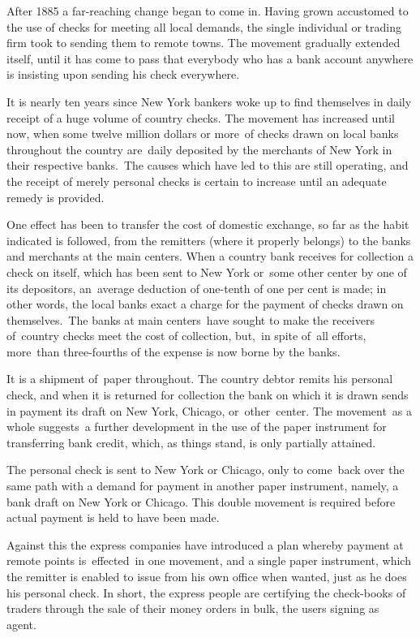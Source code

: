 \documentclass[twoside,symmetric,nobib,justified]{tufte-book}
\begin{document}
\newpage After 1885 a far-reaching change began to come in. Having grown
accustomed to the use of checks for meeting all local demands, the
single individual or trading firm took to sending them to remote towns.
The movement gradually extended itself, until it has come to pass that
everybody who has a bank account anywhere is insisting upon sending his
check everywhere. ~

It is nearly ten years since New York bankers woke up to find themselves
in daily receipt of a huge volume of country checks. The movement has
increased until now, when some twelve million dollars or more~of checks
drawn on local banks throughout the country are~daily deposited by the
merchants of New York in their respective banks.~The causes which have
led to this are still operating, and the receipt of merely personal
checks is certain to increase until an adequate remedy is provided.~

One effect has been to transfer the cost of domestic exchange, so far as
the habit indicated is followed, from the remitters (where it properly
belongs) to the banks and merchants at the main centers. When a country
bank receives for collection a check on itself, which has been sent to
New York or~some other center by one of its depositors, an~average
deduction of one-tenth of one per cent is made; in other words, the
local banks exact a charge for the payment of checks drawn on
themselves.~The banks at main centers~have sought to make the receivers
of~country checks meet the cost of collection, but,~in spite of~all
efforts, more~than three-fourths of the expense is now borne by the
banks.~~~

It is a shipment of~paper throughout. The country debtor remits his
personal check, and when it is returned for collection the bank on which
it is drawn sends in payment its draft on New York, Chicago,
or~other~center. The movement~as a whole suggests~a further development
in the use of the paper instrument for transferring bank credit, which,
as things stand, is only partially attained. ~

The personal check is sent to New York or Chicago, only to come~back
over the same path with a demand for payment in another paper
instrument, namely, a bank draft on New York or Chicago. This double
movement is required before actual payment is held to have been made.~

Against this the express companies have introduced a plan whereby
payment at remote points is~effected~in one movement, and a single paper
instrument, which the remitter is enabled to issue from his own office
when wanted, just as he does his personal check. In short, the express
people are certifying the check-books of traders through the sale of
their money orders in bulk, the users signing as agent.~
\end{document}
